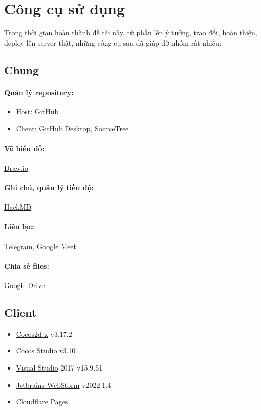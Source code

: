 \documentclass[12pt,a4paper]{article}
\begin{document}
  \newpage
  \section{Công cụ sử dụng}
  Trong thời gian hoàn thành đề tài này, từ phần lên ý tưởng, trao đổi, hoàn thiện, deploy lên server thật, những công cụ sau đã giúp đỡ nhóm rất nhiều: 
  \subsection{Chung}
  \paragraph{Quản lý repository:}
  \begin{itemize}
      \item Host: \href{https://github.com}{GitHub}
      \item Client: \href{https://desktop.github.com}{GitHub Desktop}, \href{https://www.sourcetreeapp.com}{SourceTree}
  \end{itemize}
  \paragraph{Vẽ biểu đồ:} \href{https://app.diagrams.net}{Draw.io}
  \paragraph{Ghi chú, quản lý tiến độ:} \href{https://hackmd.io}{HackMD}
  \paragraph{Liên lạc:} \href{https://telegram.org}{Telegram}, \href{https://meet.google.com}{Google Meet}
  \paragraph{Chia sẻ files:} \href{https://drive.google.com}{Google Drive}
  
  \subsection{Client}
  \begin{itemize}
      \item \href{https://cocos2d-x.org}{Cocos2d-x} v3.17.2
      \item Cocos Studio v3.10
      \item \href{https://visualstudio.microsoft.com}{Visual Studio} 2017 v15.9.51
      \item \href{https://www.jetbrains.com/webstorm}{Jetbrains WebStorm} v2022.1.4
      \item \href{https://pages.cloudflare.com}{Cloudflare Pages}
  \end{itemize}
  
\end{document}
